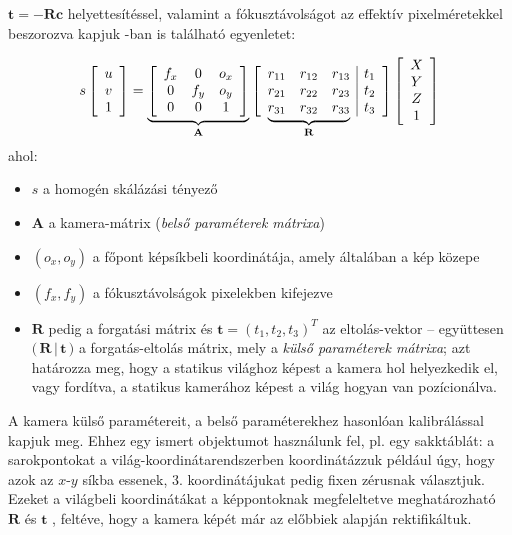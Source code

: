$\mathbf{t} = -\mathbf{R}\mathbf{c}$ helyettesítéssel, valamint a fókusztávolságot az effektív pixelméretekkel beszorozva kapjuk \cite{camera-calib}-ban is található egyenletet:

\[s \left[\begin{array}{c}
u \\ 
v \\
1
\end{array}\right] = \underbrace{\left[\begin{array}{ccc}
f_x & 0 & o_x \\ 
0 & f_y & o_y \\
0 & 0 & 1
\end{array}\right]}_{\mathbf{A}} \left[\begin{array}{ccc|cc}
r_{11} & r_{12} & r_{13} & t_1 \\ 
r_{21} & r_{22} & r_{23} & t_2 \\
\undermat{\mathbf{R}}{r_{31} & r_{32} & r_{33}} & t_3 \\
\end{array}\right] \left[\begin{array}{c}
X \\ 
Y \\
Z \\
1
\end{array}\right]\]
ahol:
\begin{itemize}[itemsep=0pt]
\item $s$ a homogén skálázási tényező
\item $\mathbf{A}$ a kamera-mátrix (\textit{belső paraméterek mátrixa})
\item $(o_x, o_y)$ a főpont képsíkbeli koordinátája, amely általában a kép közepe
\item $(f_x, f_y)$ a fókusztávolságok pixelekben kifejezve
\item $\mathbf{R}$ pedig a forgatási mátrix és $\mathbf{t} = (t_1, t_2, t_3)^T$ az eltolás-vektor -- együttesen $\Big(\,\mathbf{R}\,|\,\mathbf{t}\,\Big)$ a forgatás-eltolás mátrix, mely a \textit{külső paraméterek mátrixa}; azt határozza meg, hogy a statikus világhoz képest a kamera hol helyezkedik el, vagy fordítva, a statikus kamerához képest a világ hogyan van pozícionálva.
\end{itemize}

A kamera külső paramétereit, a belső paraméterekhez hasonlóan kalibrálással kapjuk meg. Ehhez egy ismert objektumot használunk fel, pl. egy sakktáblát: a sarokpontokat a világ-koordinátarend\-szerben koordinátázzuk például úgy, hogy azok az $x$-$y$ síkba essenek, 3. koordinátájukat pedig fixen zérusnak választjuk. Ezeket a világbeli koordinátákat a képpontoknak megfeleltetve meghatározható $\mathbf{R}$ és $\mathbf{t}$ \cite{camera-calib}, feltéve, hogy a kamera képét már az előbbiek alapján rektifikáltuk.

